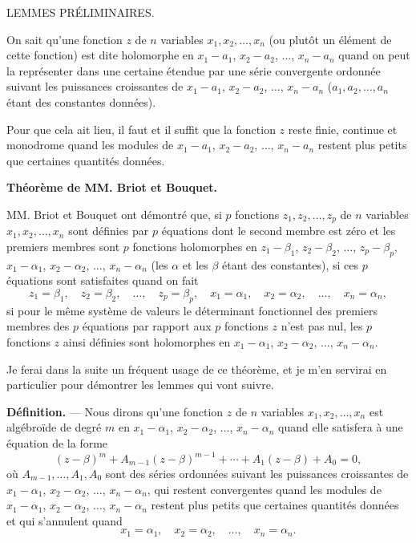 \documentclass[11pt]{article}
\begin{document}
\begin{center}
{\large LEMMES PRÉLIMINAIRES.}
\end{center}

On sait qu'une fonction $z$ de $n$ variables $x_1,x_2,\ldots,x_n$ (ou plutôt un élément de cette fonction) est dite holomorphe en $x_1-a_1$, $x_2-a_2$, $\ldots$, $x_n-a_n$ quand on peut la représenter dans une certaine étendue par une série convergente ordonnée suivant les puissances croissantes de $x_1-a_1$, $x_2-a_2$, $\ldots$, $x_n-a_n$ ($a_1,a_2,\ldots,a_n$ étant des constantes données).

Pour que cela ait lieu, il faut et il suffit que la fonction $z$ reste finie, continue et monodrome quand les modules de $x_1-a_1$, $x_2-a_2$, $\ldots$, $x_n-a_n$ restent plus petits que certaines quantités données.

\begin{center}
\textbf{Théorème de MM. Briot et Bouquet.}
\end{center}

MM. Briot et Bouquet ont démontré que, si $p$ fonctions $z_1,z_2,\ldots,z_p$ de $n$ variables $x_1,x_2,\ldots,x_n$ sont définies par $p$ équations dont le second membre est zéro et les premiers membres sont $p$ fonctions holomorphes en $z_1-\beta_1$, $z_2-\beta_2$, $\ldots$, $z_p-\beta_p$, $x_1-\alpha_1$, $x_2-\alpha_2$, $\ldots$, $x_n-\alpha_n$ (les $\alpha$ et les $\beta$ étant des constantes), si ces $p$ équations sont satisfaites quand on fait
\[
z_1=\beta_1,\quad z_2=\beta_2,\quad \ldots,\quad z_p=\beta_p,
\quad x_1=\alpha_1,\quad x_2=\alpha_2,\quad \ldots,\quad x_n=\alpha_n,
\]
si pour le même système de valeurs le déterminant fonctionnel des premiers membres des $p$ équations par rapport aux $p$ fonctions $z$ n'est pas nul, les $p$ fonctions $z$ ainsi définies sont holomorphes en $x_1-\alpha_1$, $x_2-\alpha_2$, $\ldots$, $x_n-\alpha_n$.

Je ferai dans la suite un fréquent usage de ce théorème, et je m'en servirai en particulier pour démontrer les lemmes qui vont suivre.

\medskip
\noindent\textbf{Définition.} — Nous dirons qu'une fonction $z$ de $n$ variables $x_1,x_2,\ldots,x_n$ est algébroïde de degré $m$ en $x_1-\alpha_1$, $x_2-\alpha_2$, $\ldots$, $x_n-\alpha_n$ quand elle satisfera à une équation de la forme
\[
(z-\beta)^m+A_{m-1}(z-\beta)^{m-1}+\cdots+A_1(z-\beta)+A_0=0,
\]
où $A_{m-1},\ldots,A_1,A_0$ sont des séries ordonnées suivant les puissances croissantes de $x_1-\alpha_1$, $x_2-\alpha_2$, $\ldots$, $x_n-\alpha_n$, qui restent convergentes quand les modules de $x_1-\alpha_1$, $x_2-\alpha_2$, $\ldots$, $x_n-\alpha_n$ restent plus petits que certaines quantités données et qui s'annulent quand
\[
x_1=\alpha_1,
\quad x_2=\alpha_2,
\quad \ldots,
\quad x_n=\alpha_n.
\]
\end{document}
